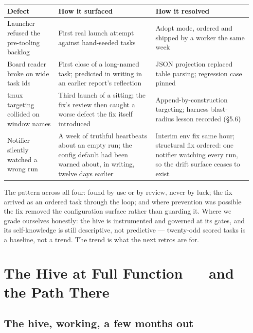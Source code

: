 \begin{center}\small
\begin{tabular}{@{}L{31mm}L{45mm}L{44mm}@{}}
\toprule
\textbf{Defect} & \textbf{How it surfaced} & \textbf{How it resolved} \\
\midrule
Launcher refused the pre-tooling backlog & First real launch attempt against hand-seeded tasks & Adopt mode, ordered and shipped by a worker the same week \\
Board reader broke on wide task ids & First close of a long-named task; predicted in writing in an earlier report's reflection & JSON projection replaced table parsing; regression case pinned \\
tmux targeting collided on window names & Third launch of a sitting; the fix's review then caught a worse defect the fix itself introduced & Append-by-construction targeting; harness blast-radius lesson recorded (\S5.6) \\
Notifier silently watched a wrong run & A week of truthful heartbeats about an empty run; the config default had been warned about, in writing, twelve days earlier & Interim env fix same hour; structural fix ordered: one notifier watching every run, so the drift surface ceases to exist \\
\bottomrule
\end{tabular}
\end{center}

The pattern across all four: found by use or by review, never by luck; the fix arrived as an ordered task through the loop; and where prevention was possible the fix removed the configuration surface rather than guarding it. Where we grade ourselves honestly: the hive is instrumented and governed at its gates, and its self-knowledge is still descriptive, not predictive --- twenty-odd scored tasks is a baseline, not a trend. The trend is what the next retros are for.

\section{The Hive at Full Function --- and the Path There}

\subsection{The hive, working, a few months out}

